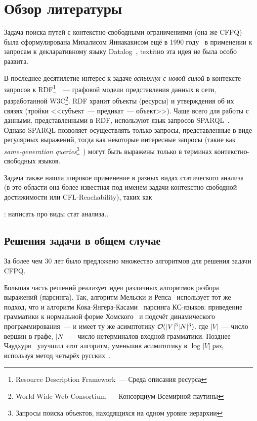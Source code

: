 \section{Обзор литературы}

Задача поиска путей с контекстно-свободными ограничениями (она же CFPQ) была сформулирована Михалисом Яннакакисом ещё в 1990 году~\cite{Yannakakis1990} в применении к запросам к декларативному языку Datalog~\cite{DatalogWiki, Ceri1989}, textit{но эта идея не была особо развита}.

В последнее десятилетие интерес к задаче \textit{вспыхнул с новой силой} в контексте запросов к RDF\footnote{Resource Description Framework~--- Среда описания ресурса}~\cite{RDF}~--- графовой модели представления данных в сети, разработанной W3C\footnote{World Wide Web Consortium~--- Консорциум Всемирной паутины}. RDF хранит объекты (ресурсы) и утверждения об их связях (тройки <<субъект~--- предикат~--- объект>>). Чаще всего для работы с данными, представленными в RDF, используют язык запросов SPARQL~\cite{SPARQL}. Однако SPARQL позволяет осуществлять только запросы, представленные в виде регулярных выражений, тогда как некоторые интересные запросы (такие как \textit{same-generation queries}\footnote{Запросы поиска объектов, находящихся на одном уровне иерархии}~\cite{Abiteboul1995}) могут быть выражены только в терминах контекстно-свободных языков.

Задача также нашла широкое применение в разных видах статического анализа~\cite{Reps1998} (в это области она более известная под именем задачи контекстно-свободной достижимости или CFL-Reachability), таких как 

\TODO: написать про виды стат анализа..



\subsection{Решения задачи в общем случае}

За более чем 30 лет было предложено множество алгоритмов для решения задачи CFPQ. 

Большая часть решений реализует идеи различных алгоритмов разбора выражений (парсинга). Так, алгоритм Мельски и Репса~\cite{Reps97} использует тот же подход, что и алгоритм Кока-Янгера-Касами~\cite{Younger1967} парсинга КС-языков: приведение грамматики к нормальной форме Хомского~\cite{Chomsky1957} и подсчёт динамического программирования~--- и имеет ту же асимптотику $\mathcal{O}(|V|^3 |N|^3)$, где $|V|$~--- число вершин в графе, $|N|$~--- число нетерминалов входной грамматики. Позднее Чаудхури~\cite{Chaudhuri06} улучшил этот алгоритм, уменьшив асимптотику в $\log |V|$ раз, используя метод четырёх русских~\cite{Arlazarov70}.

